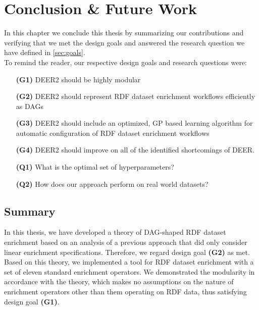 \chapter{Conclusion \& Future Work}
\label{sec:summary}

In this chapter we conclude this thesis by summarizing our contributions and verifying that we met the design goals and answered the research question we have defined in \autoref{sec:goals}.\\

To remind the reader, our respective design goals and research questions were:

\begin{itemize}
  \item[\textbf{(G1)}] \ac{DEER2} should be highly modular
  \item[\textbf{(G2)}] \ac{DEER2} should represent \ac{RDF} dataset enrichment workflows efficiently as \acp{DAG}
  \item[\textbf{(G3)}] \ac{DEER2} should include an optimized, \ac{GP} based learning algorithm for automatic configuration of \ac{RDF} dataset enrichment workflows
  \item[\textbf{(G4)}] \ac{DEER2} should improve on all of the identified shortcomings of \ac{DEER}.
\end{itemize}

\begin{itemize}
  \item[\textbf{(Q1)}] What is the optimal set of hyperparameters?
  \item[\textbf{(Q2)}] How does our approach perform on real world datasets?
\end{itemize}

\label{ch:conclusion}
\section{Summary}
In this thesis, we have developed a theory of \ac{DAG}-shaped \ac{RDF} dataset enrichment based on an analysis of a previous approach that did only consider linear enrichment specifications.
Therefore, we regard design goal \textbf{(G2)} as met.
Based on this theory, we implemented a tool for \ac{RDF} dataset enrichment with a set of eleven standard enrichment operators.
We demonstrated the modularity in accordance with the theory, which makes no assumptions on the nature of enrichment operators other than them operating on \ac{RDF} data, thus satisfying design goal \textbf{(G1)}.\\

